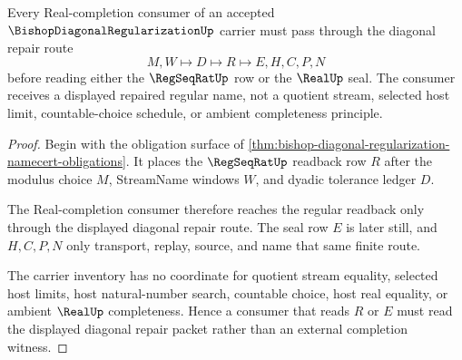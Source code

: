 \begin{theorem}
\label{thm:bishop-diagonal-regularization-regseqrat-handoff}
Every Real-completion consumer of an accepted $\BishopDiagonalRegularizationUp$ carrier must pass through the diagonal repair route
$$
M,W \longmapsto D \longmapsto R \longmapsto E,H,C,P,N
$$
before reading either the $\RegSeqRatUp$ row or the $\RealUp$ seal. The consumer receives a displayed repaired regular name, not a quotient stream, selected host limit, countable-choice schedule, or ambient completeness principle.
\end{theorem}
\begin{proof}
Begin with the obligation surface of \autoref{thm:bishop-diagonal-regularization-namecert-obligations}. It places the $\RegSeqRatUp$ readback row $R$ after the modulus choice $M$, StreamName windows $W$, and dyadic tolerance ledger $D$.

The Real-completion consumer therefore reaches the regular readback only through the displayed diagonal repair route. The seal row $E$ is later still, and $H,C,P,N$ only transport, replay, source, and name that same finite route.

The carrier inventory has no coordinate for quotient stream equality, selected host limits, host natural-number search, countable choice, host real equality, or ambient $\RealUp$ completeness. Hence a consumer that reads $R$ or $E$ must read the displayed diagonal repair packet rather than an external completion witness.
\end{proof}


\begin{closurestatus}{\BishopDiagonalRegularizationUp}
  \theoryclosure{\seedClosure}
  \formalstatus{\encodedDefV}
\end{closurestatus}
